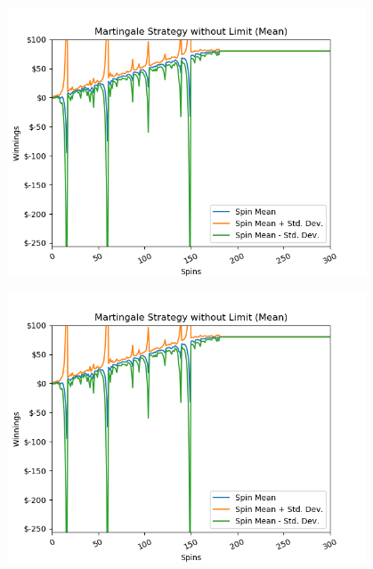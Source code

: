 \documentclass[
	letterpaper, %
]{jdf}
\begin{document}
\begin{jdffigure}
\includegraphics[height=8cm]{../../martingale/martingale_no_limits_mean.png}
\label{fig:martingale_no_limits_mean}
\end{jdffigure}

\begin{jdffigure}
\includegraphics[height=8cm]{../../martingale/martingale_no_limits_mean.png}
\label{fig:martingale_no_limits_median}
\end{jdffigure}
\end{document}
